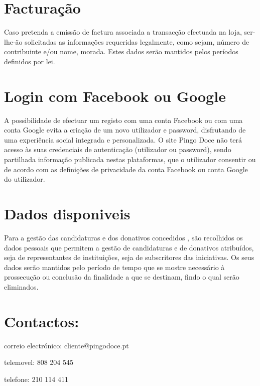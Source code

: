 \section{Facturação}

Caso pretenda a emissão de factura associada a transacção efectuada na loja, ser-lhe-ão solicitadas as informações requeridas legalmente, como sejam, número de contribuinte e/ou nome, morada. Estes dados serão mantidos pelos períodos definidos por lei.



\section{Login com Facebook ou Google}

A possibilidade de efectuar um registo com uma conta Facebook ou com uma conta Google evita a criação de um novo utilizador e password, disfrutando de uma experiência social integrada e personalizada. O site Pingo Doce não terá acesso às suas credenciais de autenticação (utilizador ou password), sendo partilhada informação publicada nestas plataformas, que o utilizador consentir ou de acordo com as definições de privacidade da conta Facebook ou conta Google do utilizador.



\section{Dados disponiveis}

Para a gestão das candidaturas e dos donativos concedidos , são recolhidos os dados pessoais que permitem a gestão de candidaturas e de donativos atribuídos, seja de representantes de instituições, seja de subscritores das iniciativas. Os seus dados serão mantidos pelo período de tempo que se mostre necessário à prossecução ou conclusão da finalidade a que se destinam, findo o qual serão eliminados.



\section{Contactos:}


correio electrónico: cliente@pingodoce.pt\newline


telemovel: 808 204 545 \newline


telefone: 210 114 411\newline


